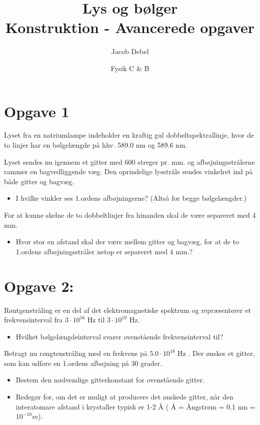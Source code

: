 \documentclass[a4paper, 12pt]{article}
\author{Jacob Debel}
\date{Fysik C \& B}
\title{Lys og bølger\\\medskip
\large Konstruktion - Avancerede opgaver}
\begin{document}
\maketitle



\section*{Opgave 1}
\label{sec:org3a39aba}

Lyset fra en natriumlampe indeholder en kraftig gul dobbeltspektrallinje, hvor de to linjer har en
bølgelængde på hhv. 589.0 nm og 589.6 nm.

Lyset sendes nu igennem et gitter med 600 streger pr. mm. og afbøjningsstrålerne rammer en
bagvedliggende væg. Den oprindelige lysstråle sendes vinkelret ind på både gitter og bagvæg.

\begin{itemize}
\item I hvilke vinkler ses 1.ordens afbøjningerne? (Altså for begge bølgelængder.)
\end{itemize}

For at kunne skelne de to dobbeltlinjer fra hinanden skal de være separeret med 4 mm.

\begin{itemize}
\item Hvor stor en afstand skal der være mellem gitter og bagvæg, for at de to 1.ordens afbøjningsstråler netop er separeret med 4 mm.?
\end{itemize}

\section*{Opgave 2:}
\label{sec:orgc329388}

Røntgenstråling er en del af det elektromagnetiske spektrum og repræsenterer et frekvensinterval fra \(3 \cdot 10^{16}\) Hz til \(3\cdot 10^{19}\) Hz.

\begin{itemize}
\item Hvilket bølgelængdeinterval svarer ovenstående frekvensinterval til?
\end{itemize}

Betragt nu røngtenstråling med en frekvens på \(5.0\cdot 10^{18}\) Hz . Der ønskes et gitter, som kan
udføre en 1.ordens afbøjning på 30 grader.

\begin{itemize}
\item Bestem den nødvendige gitterkonstant for ovenstående gitter.

\item Redegør for, om det er muligt at producere det ønskede gitter, når den interatomare afstand i krystaller typisk er 1-2 Å ( Å = Ångstrøm = 0.1 nm = \(10^{-10} m\)).
\end{itemize}
\newpage
\end{document}
